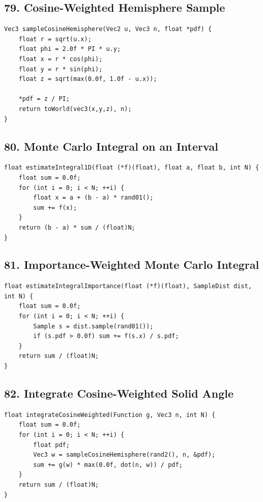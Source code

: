 \documentclass[10pt,letterpaper]{article}
\begin{document}
\subsection{79. Cosine-Weighted Hemisphere Sample}

\begin{verbatim}
Vec3 sampleCosineHemisphere(Vec2 u, Vec3 n, float *pdf) {
    float r = sqrt(u.x);
    float phi = 2.0f * PI * u.y;
    float x = r * cos(phi);
    float y = r * sin(phi);
    float z = sqrt(max(0.0f, 1.0f - u.x));

    *pdf = z / PI;
    return toWorld(vec3(x,y,z), n);
}
\end{verbatim}

\subsection{80. Monte Carlo Integral on an Interval}

\begin{verbatim}
float estimateIntegral1D(float (*f)(float), float a, float b, int N) {
    float sum = 0.0f;
    for (int i = 0; i < N; ++i) {
        float x = a + (b - a) * rand01();
        sum += f(x);
    }
    return (b - a) * sum / (float)N;
}
\end{verbatim}

\subsection{81. Importance-Weighted Monte Carlo Integral}

\begin{verbatim}
float estimateIntegralImportance(float (*f)(float), SampleDist dist, int N) {
    float sum = 0.0f;
    for (int i = 0; i < N; ++i) {
        Sample s = dist.sample(rand01());
        if (s.pdf > 0.0f) sum += f(s.x) / s.pdf;
    }
    return sum / (float)N;
}
\end{verbatim}

\subsection{82. Integrate Cosine-Weighted Solid Angle}

\begin{verbatim}
float integrateCosineWeighted(Function g, Vec3 n, int N) {
    float sum = 0.0f;
    for (int i = 0; i < N; ++i) {
        float pdf;
        Vec3 w = sampleCosineHemisphere(rand2(), n, &pdf);
        sum += g(w) * max(0.0f, dot(n, w)) / pdf;
    }
    return sum / (float)N;
}
\end{verbatim}
\end{document}
